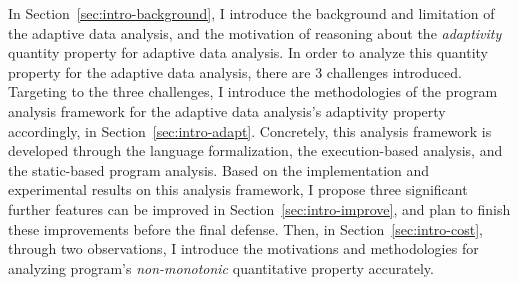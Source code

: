 In Section~\ref{sec:intro-background},
I introduce the background and limitation of the 
adaptive data analysis, 
and the motivation of reasoning about the \emph{adaptivity} quantity property 
for adaptive data analysis.
In order to analyze this quantity property for the adaptive data analysis, there are 3 challenges
introduced.
Targeting to the three challenges, I introduce the methodologies 
of the program analysis framework for the adaptive data analysis's adaptivity property
accordingly, in Section~\ref{sec:intro-adapt}.
Concretely, 
this analysis framework is developed through the language formalization,
the execution-based analysis, and the static-based program analysis.
%
Based on the implementation and experimental results on this analysis framework, 
I propose three significant 
further features can be improved 
in Section~\ref{sec:intro-improve}, 
and plan to finish these improvements 
before the final defense.
%
 Then, in Section~\ref{sec:intro-cost}, through two observations, 
 I introduce the motivations and methodologies
 for 
analyzing program's \emph{non-monotonic} quantitative property accurately.

